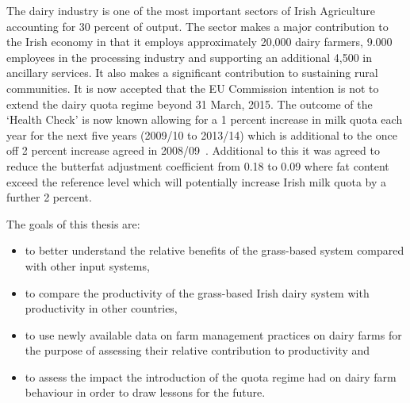 \documentclass[12pt]{report}
\begin{document}


The dairy industry is one of the most important sectors of Irish Agriculture accounting for 30 percent of output. The sector makes a major contribution to the Irish economy in that it employs approximately 20,000 dairy farmers, 9.000 employees in the processing industry and supporting an additional 4,500 in ancillary services. It also makes a significant contribution to sustaining rural communities. %
It is now accepted that the EU Commission intention is not to extend the dairy quota regime beyond 31 March, 2015. The outcome of the ‘Health Check’ is now known allowing for a 1 percent increase in milk quota each year for the next five years (2009/10 to 2013/14) which is additional to the once off 2 percent increase agreed in 2008/09~\citep{eucom09}. Additional to this it was agreed to reduce the butterfat adjustment coefficient from 0.18 to 0.09 where fat content exceed the reference level which will potentially increase Irish milk quota by a further 2 percent. 

The goals of this thesis are:
\begin{itemize}
\item  to better understand the relative benefits of the grass-based system compared with other input systems,
\item  to compare the productivity of the grass-based Irish dairy system with productivity in other countries,
\item  to use newly available data on farm management practices on dairy farms for the purpose of assessing their relative contribution to productivity and
\item  to assess the impact the introduction of the quota regime had on dairy farm behaviour in order to draw lessons for the future. 
\end{itemize}
\end{document}
